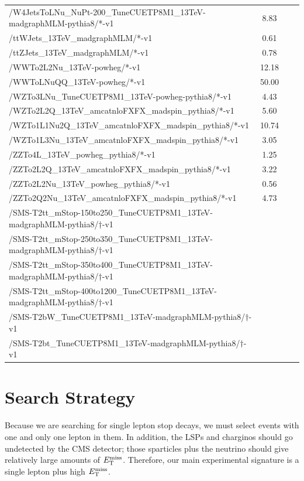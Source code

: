 \begin{table}[htp]
{\begin{tabular}{|l|c|c|c|}
/W4JetsToLNu\_NuPt-200\_TuneCUETP8M1\_13TeV-madgraphMLM-pythia8/*-v1 & 8.83 \\
/ttWJets\_13TeV\_madgraphMLM/*-v1 & 0.61 \\
/ttZJets\_13TeV\_madgraphMLM/*-v1 & 0.78 \\
/WWTo2L2Nu\_13TeV-powheg/*-v1 & 12.18 \\
/WWToLNuQQ\_13TeV-powheg/*-v1 & 50.00  \\
/WZTo3LNu\_TuneCUETP8M1\_13TeV-powheg-pythia8/*-v1 & 4.43 \\
/WZTo2L2Q\_13TeV\_amcatnloFXFX\_madspin\_pythia8/*-v1 & 5.60 \\
/WZTo1L1Nu2Q\_13TeV\_amcatnloFXFX\_madspin\_pythia8/*-v1 & 10.74 \\
/WZTo1L3Nu\_13TeV\_amcatnloFXFX\_madspin\_pythia8/*-v1 & 3.05 \\
/ZZTo4L\_13TeV\_powheg\_pythia8/*-v1 & 1.25 \\
/ZZTo2L2Q\_13TeV\_amcatnloFXFX\_madspin\_pythia8/*-v1 & 3.22 \\
/ZZTo2L2Nu\_13TeV\_powheg\_pythia8/*-v1 & 0.56 \\
/ZZTo2Q2Nu\_13TeV\_amcatnloFXFX\_madspin\_pythia8/*-v1 & 4.73 \\
/SMS-T2tt\_mStop-150to250\_TuneCUETP8M1\_13TeV-madgraphMLM-pythia8/$\dagger$-v1 & \\
/SMS-T2tt\_mStop-250to350\_TuneCUETP8M1\_13TeV-madgraphMLM-pythia8/$\dagger$-v1 & \\
/SMS-T2tt\_mStop-350to400\_TuneCUETP8M1\_13TeV-madgraphMLM-pythia8/$\dagger$-v1 & \\
/SMS-T2tt\_mStop-400to1200\_TuneCUETP8M1\_13TeV-madgraphMLM-pythia8/$\dagger$-v1 & \\
/SMS-T2bW\_TuneCUETP8M1\_13TeV-madgraphMLM-pythia8/$\dagger$-v1 & \\
/SMS-T2bt\_TuneCUETP8M1\_13TeV-madgraphMLM-pythia8/$\dagger$-v1 & \\
\hline
\end{tabular}
}
\end{table}

\section{Search Strategy}
\label{sec:stop:searchstrategy}

Because we are searching for single lepton stop decays, we must select
events with one and only one lepton in them. In addition, the LSPs and
charginos should go undetected by the CMS detector; those sparticles
plus the neutrino should give relatively
large amounts of $E_\text{T}^\text{miss}$. Therefore, our main experimental signature is a
single lepton plus high $E_\text{T}^\text{miss}$.

